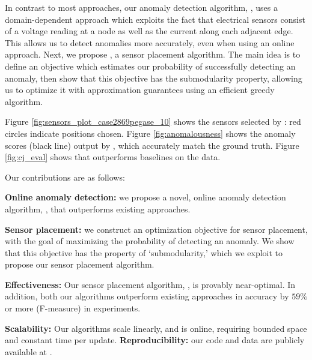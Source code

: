 In contrast to most approaches, our anomaly detection algorithm, \methodD, uses a domain-dependent approach which exploits the fact that electrical sensors consist of a voltage reading at a node as well as the current along each adjacent edge. This allows us to detect anomalies more accurately, even when using an online approach. Next, we propose \method, a sensor placement algorithm. The main idea is to define an objective which estimates our probability of successfully detecting an anomaly, then show that this objective has the submodularity property, allowing us to optimize it with approximation guarantees using an efficient greedy algorithm. 

Figure \ref{fig:sensors_plot_case2869pegase_10} shows the sensors selected by \method: red circles indicate positions chosen. Figure \ref{fig:anomalousness} shows the anomaly scores (black line) output by \methodD, which accurately match the ground truth. Figure \ref{fig:cj_eval} shows that \method outperforms baselines on the \datasmall data. 

Our contributions are as follows:

\ben
\item {\bf Online anomaly detection:} we propose a novel, online anomaly detection algorithm, \methodD, that outperforms existing approaches.
\item {\bf Sensor placement:} we construct an optimization objective for sensor placement, with the goal of maximizing the probability of detecting an anomaly. We show that this objective has the property of `submodularity,' which we exploit to propose our sensor placement algorithm.
\item {\bf Effectiveness:} Our sensor placement algorithm, \method, is provably near-optimal. In addition, both our algorithms outperform existing approaches in accuracy by $59\%$ or more (F-measure) in experiments. 
\item {\bf Scalability:} Our algorithms scale linearly, and \methodD is online, requiring bounded space and constant time per update. 
\een
\textbf{Reproducibility:} our code and data are publicly available at \codeurl.


